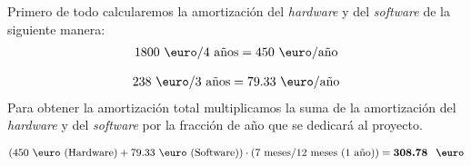 Primero de todo calcularemos la amortización del \textit{hardware} y del \textit{software} de la siguiente manera:
\begin{eqnarray} 
1800 \mbox{ \euro} / 4 \mbox{ años} = 450 \mbox{ \euro/año}
\end{eqnarray}

\begin{eqnarray} 
238 \mbox{ \euro} / 3 \mbox{ años} = 79.33 \mbox{ \euro/año}
\end{eqnarray}
Para obtener la amortización total multiplicamos la suma de la amortización del \textit{hardware} y del \textit{software} por la fracción de año que se dedicará al proyecto.

\begin{eqnarray} 
(450 \mbox{ \euro (Hardware)} + 79.33 \mbox{ \euro (Software)}) \cdot (7 \mbox{ meses} / 12 \mbox{ meses (1 año)}) = \textbf{308.78 \mbox{ \euro}}
\end{eqnarray}


















